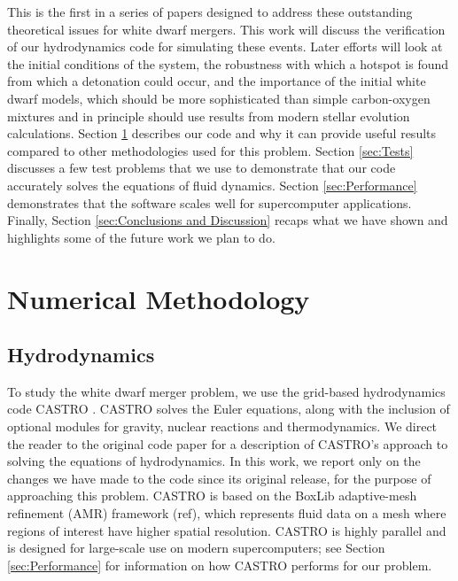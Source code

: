 \documentclass[12pt,preprint]{aastex}
\begin{document}
This is the first in a series of papers designed to address these outstanding theoretical issues for white dwarf mergers. This work will discuss the verification of our hydrodynamics code for simulating these events. Later efforts will look at the initial conditions of the system, the robustness with which a hotspot is found from which a detonation could occur, and the importance of the initial white dwarf models, which should be more sophisticated than simple carbon-oxygen mixtures and in principle should use results from modern stellar evolution calculations. Section \ref{sec:Numerical Methodology} describes our code and why it can provide useful results compared to other methodologies used for this problem. Section \ref{sec:Tests} discusses a few test problems that we use to demonstrate that our code accurately solves the equations of fluid dynamics. Section \ref{sec:Performance} demonstrates that the software scales well for supercomputer applications. Finally, Section \ref{sec:Conclusions and Discussion} recaps what we have shown and highlights some of the future work we plan to do.

\section{Numerical Methodology}\label{sec:Numerical Methodology}

\subsection{Hydrodynamics}

To study the white dwarf merger problem, we use the grid-based hydrodynamics code CASTRO \citep{castro}. CASTRO solves the Euler equations, along with the inclusion of optional modules for gravity, nuclear reactions and thermodynamics. We direct the reader to the original code paper for a description of CASTRO's approach to solving the equations of hydrodynamics. In this work, we report only on the changes we have made to the code since its original release, for the purpose of approaching this problem. CASTRO is based on the BoxLib adaptive-mesh refinement (AMR) framework (ref), which represents fluid data on a mesh where regions of interest have higher spatial resolution. CASTRO is highly parallel and is designed for large-scale use on modern supercomputers; see Section \ref{sec:Performance} for information on how CASTRO performs for our problem.
\end{document}
